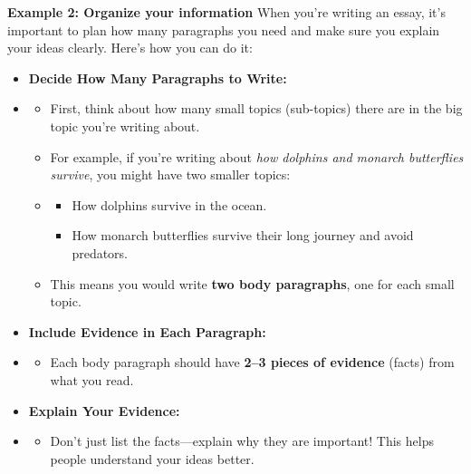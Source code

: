 \documentclass[12pt]{article}
\begin{document}
\begin{tcolorbox}[colframe=black!60, colback=white, 
coltitle=black, colbacktitle=black!15, fonttitle=\bfseries\Large, 
title=Examples, halign title=center, left=10pt, right=10pt, top=10pt, bottom=15pt]



\textbf{Example 2: Organize your information} When you're writing an essay, it's important to plan how many paragraphs you need and make sure you explain your ideas clearly. Here's how you can do it:

\begin{itemize}
    \item \textbf{Decide How Many Paragraphs to Write:}
   \item  \begin{itemize}
        \item First, think about how many small topics (sub-topics) there are in the big topic you're writing about.
        \item For example, if you're writing about \textit{how dolphins and monarch butterflies survive}, you might have two smaller topics:
      \item  \begin{itemize}
            \item How dolphins survive in the ocean.
            \item How monarch butterflies survive their long journey and avoid predators.
        \end{itemize}
        \item This means you would write \textbf{two body paragraphs}, one for each small topic.
    \end{itemize}

    \item \textbf{Include Evidence in Each Paragraph:}
    \item \begin{itemize}
        \item Each body paragraph should have \textbf{2--3 pieces of evidence} (facts) from what you read.
    
    \end{itemize}

    \item \textbf{Explain Your Evidence:}
    \item \begin{itemize}
        \item Don't just list the facts—explain why they are important! This helps people understand your ideas better.
  

\end{itemize}
\end{itemize}
\end{tcolorbox}
\end{document}
